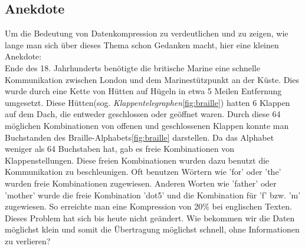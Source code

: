 \documentclass[a4paper,11pt]{scrartcl}%
\theoremstyle{change}
\theoremstyle{nonumberplain}
\theoremstyle{change}
\theoremstyle{nonumberplain}
\theoremstyle{change}
\theoremstyle{nonumberplain}
\begin{document}
\subsection{Anekdote}
Um die Bedeutung von Datenkompression zu verdeutlichen und zu zeigen, wie lange man sich über dieses Thema schon Gedanken macht, hier eine kleinen Anekdote:\\
Ende des 18. Jahrhunderts benötigte die britische Marine eine schnelle Kommunikation zwischen London und dem Marinestützpunkt an der Küste. Dies wurde durch eine Kette von Hütten auf Hügeln in etwa 5 Meilen Entfernung umgesetzt. Diese Hütten(sog. \textit{Klappentelegraphen}\ref{fig:braille}) hatten 6 Klappen auf dem Dach, die entweder geschlossen oder geöffnet waren. Durch diese 64 möglichen Kombinationen von offenen und geschlossenen Klappen konnte man Buchstanden des Braille-Alphabets\ref{fig:braille} darstellen. Da das Alphabet weniger als 64 Buchstaben hat, gab es freie Kombinationen von Klappenstellungen. Diese freien Kombinationen wurden dazu benutzt die Kommunikation zu beschleunigen. Oft benutzen Wörtern wie 'for' oder 'the' wurden freie Kombinationen zugewiesen. Anderen Worten wie 'father' oder 'mother' wurde die freie Kombination 'dot5' und die Kombination für 'f' bzw. 'm' zugewiesen. So erreichte man eine Kompression von 20\% bei englischen Texten.\cite[S.1-4]{bellTextCompression} \\
Dieses Problem hat sich bis heute nicht geändert. Wie bekommen wir die Daten möglichst klein und somit die Übertragung möglichst schnell, ohne Informationen zu verlieren?
\end{document}
